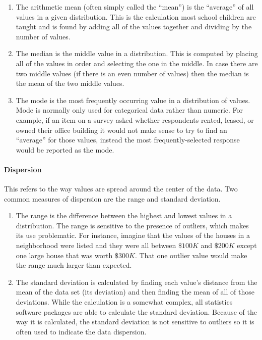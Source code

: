 \begin{enumerate}

	\item The arithmetic mean (often simply called the ``mean'') is the ``average'' of all values in a given distribution. This is the calculation most school children are taught and is found by adding all of the values together and dividing by the number of values.

	\item The median is the middle value in a distribution. This is computed by placing all of the values in order and selecting the one in the middle. In case there are two middle values (if there is an even number of values) then the median is the mean of the two middle values.
	
	\item The mode is the most frequently occurring value in a distribution of values. Mode is normally only used for categorical data rather than numeric. For example, if an item on a survey asked whether respondents rented, leased, or owned their office building it would not make sense to try to find an ``average'' for those values, instead the most frequently-selected response would be reported as the mode. 

\end{enumerate}

\paragraph{Dispersion} This refers to the way values are spread around the center of the data. Two common measures of dispersion are the range and standard deviation. 

\begin{enumerate}
	\item The range is the difference between the highest and lowest values in a distribution. The range is sensitive to the presence of outliers, which makes its use problematic. For instance, imagine that the values of the houses in a neighborhood were listed and they were all between $ \$100K $ and $ \$200K $ except one large house that was worth $ \$ 300K $. That one outlier value would make the range much larger than expected.

	\item The standard deviation is calculated by finding each value's distance from the mean of the data set (its deviation) and then finding the mean of all of those deviations. While the calculation is a somewhat complex, all statistics software packages are able to calculate the standard deviation. Because of the way it is calculated, the standard deviation is not sensitive to outliers so it is often used to indicate the data dispersion.

\end{enumerate}

